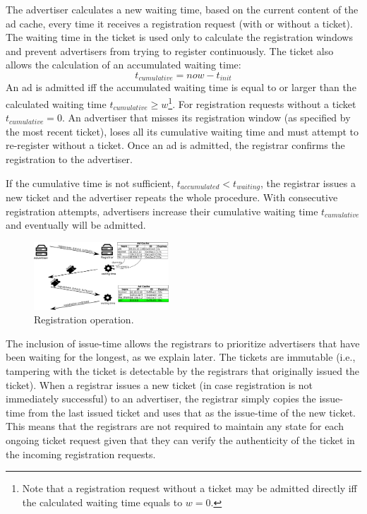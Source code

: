 The advertiser calculates a new waiting time, based on the current content of
the ad cache, every time it receives a registration request (with or without
a ticket). The waiting time in the ticket is used only to calculate the
registration windows and prevent advertisers from trying to register
continuously. The ticket also allows the calculation of an accumulated waiting time:
\begin{equation}
    t_\textit{cumulative} = \textit{now} - t_\textit{init}
\end{equation}
An ad is admitted iff the accumulated waiting time is equal to or larger than the calculated waiting time $t_\textit{cumulative} \ge w$\footnote{Note that a registration request without a ticket may be admitted directly iff the calculated waiting time equals to $w=0$.}. For registration requests without a ticket $t_\textit{cumulative} = 0$. An advertiser that misses its registration window (as specified by the most recent ticket), loses all its cumulative waiting time and must attempt to re-register without a ticket. Once an ad is admitted, the registrar confirms the registration to the advertiser.

If the cumulative time is not sufficient, $t_\textit{accumulated} < t_\textit{waiting}$, the registrar issues a new ticket and the advertiser repeats the whole procedure. With consecutive registration attempts, advertisers increase their cumulative waiting time $t_\textit{cumulative}$ and eventually will be admitted. 


\begin{figure}
    \includegraphics[width=0.45\textwidth]{img/registration}
    \vspace{-0.15in}
    \caption{Registration operation.}
    \label{fig:registration}
    \vspace{-0.15in}
\end{figure}

The inclusion of issue-time allows the registrars to prioritize advertisers that have been waiting for the longest, as we explain later. The tickets are immutable (i.e., tampering with the ticket is detectable by the registrars that originally issued the ticket).  When a registrar issues a new ticket (in case registration is not immediately successful) to an advertiser, the registrar simply copies the issue-time from the last issued ticket and uses that as the issue-time of the new ticket. This means that the registrars are not required to maintain any state for each ongoing ticket request given that they can verify the authenticity of the ticket in the incoming registration requests.



